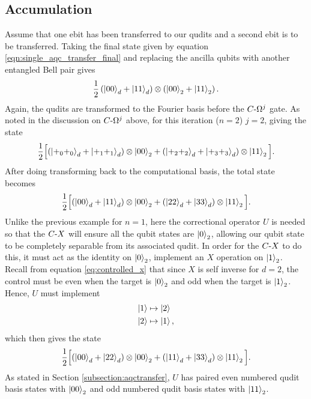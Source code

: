 \subsection{Accumulation}
\label{subsection:accumulation}
Assume that one ebit has been transferred to our qudits and a second ebit is to be transferred.
Taking the final state given by equation \ref{eqn:single_aqc_transfer_final} and replacing the ancilla qubits with another entangled Bell pair gives
\begin{equation}
    \frac{1}{2}\left(
            \ket{00}_d +\ket{11}_d
        \right)
        \otimes 
        \left(
            \ket{00}_2 +\ket{11}_2
        \right).
\end{equation}
Again, the qudits are transformed to the Fourier basis before the $C\text{-}\Omega^j$ gate.
As noted in the discussion on $C\text{-}\Omega^j$ above, for this iteration ($n=2$) $j=2$, giving the state
\begin{equation}
    \frac{1}{2}\Big[
            (\ket{+_0 +_0}_d + \ket{+_1 +_1}_d)\otimes\ket{00}_2
            +(\ket{+_2 +_2}_d + \ket{+_3 +_3}_d)\otimes\ket{11}_2
        \Big].
\end{equation}
After doing transforming back to the computational basis, the total state becomes
\begin{equation}
    \frac{1}{2}\Big[
            (\ket{00}_d + \ket{11}_d)\otimes\ket{00}_2
            +(\ket{22}_d + \ket{33}_d)\otimes\ket{11}_2
        \Big].
\end{equation}
Unlike the previous example for $n=1$, here the correctional operator $U$ is needed so that the $C\text{-}X$ will ensure all the qubit states are $\ket{0}_2$, allowing our qubit state to be completely separable from its associated qudit.
In order for the $C\text{-}X$ to do this, it must act as the identity on $\ket{0}_2$, implement an $X$ operation on $\ket{1}_2$.
Recall from equation \ref{eq:controlled_x} that since $X$ is self inverse for $d=2$, the control must be even when the target is $\ket{0}_2$ and odd when the target is $\ket{1}_2$.
Hence, $U$ must implement
\begin{align}
    \ket{1} &\mapsto \ket{2}\\
    \ket{2} &\mapsto \ket{1},
\end{align}
which then gives the state
\begin{equation}
    \frac{1}{2}\Big[
            (\ket{00}_d + \ket{22}_d)\otimes\ket{00}_2
            +(\ket{11}_d + \ket{33}_d)\otimes\ket{11}_2
        \Big].
\end{equation}
As stated in Section \ref{subsection:aqctransfer}, $U$ has paired even numbered qudit basis states with $\ket{00}_2$ and odd numbered qudit basis states with $\ket{11}_2$.
